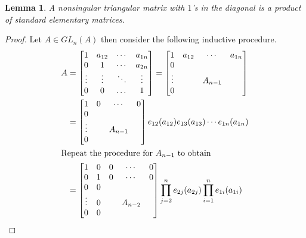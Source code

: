 \documentclass[12pt]{article}
\numberwithin{equation}{section}
\newcounter{dummy} \numberwithin{dummy}{section}
\newtheorem{lemma}[dummy]{Lemma}
\begin{document}
	\begin{lemma}\label{diag1andprodelementary}
		A nonsingular triangular matrix with $1$'s in the diagonal is a product of standard elementary matrices.
	\end{lemma}
	\begin{proof}
		Let $A \in GL_n(A)$ then consider the following inductive procedure.
		\begin{align*}
			A&= \begin{bmatrix}
				1 & a_{12} &\cdots &a_{1n}\\
				0& 1 & \cdots &a_{2n}\\
				\vdots & \vdots  & \ddots  & \vdots \\
				0 & 0 & \dots & 1
			\end{bmatrix}
			= \begin{bmatrix}
				1 & a_{12} &\cdots &a_{1n}\\
				0&  &   &\\
				\vdots &  & A_{n-1}  &  \\
				0 &  & & 
			\end{bmatrix}\\
			&=\begin{bmatrix}
				1 & 0 &\cdots &0\\
				0&  &   &\\
				\vdots &  & A_{n-1}  &  \\
				0 &  & & 
			\end{bmatrix} e_{12}(a_{12}) e_{13}(a_{13}) \cdots e_{1n}(a_{1n})\\
			\intertext{Repeat the procedure for $A_{n-1}$ to obtain}
			&= \begin{bmatrix}
				1 & 0 & 0 & \cdots & 0 \\
				0 & 1 & 0 & \cdots & 0\\
				0 & 0 &   &  &\\
				\vdots & 0 &   &A_{n-2}  &\\
				0 & 0 &   &  &
			\end{bmatrix}\prod_{j=2}^n e_{2j}(a_{2j}) \prod_{i=1}^n e_{1i} (a_{1i})
		\end{align*}
	\end{proof}
\end{document}
